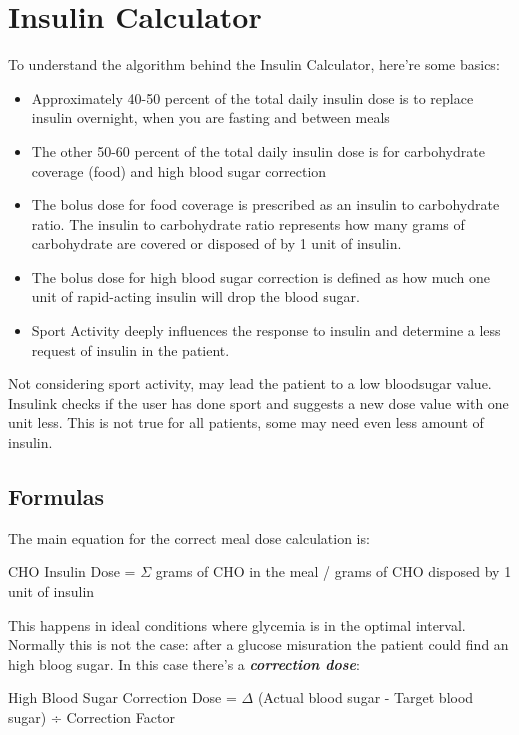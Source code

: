 \documentclass[12pt,hidelinks]{article}
\begin{document}
\section{Insulin Calculator}
\vspace{10.5cm}
To understand the algorithm behind the Insulin Calculator, here're some basics:
\begin{itemize}
 \item  Approximately 40-50 percent of the total daily insulin dose is to replace insulin overnight, when you are fasting and between meals
 \item  The other 50-60 percent of the total daily insulin dose is for carbohydrate coverage (food) and high blood sugar correction
 \item The bolus dose for food coverage is prescribed as an insulin to carbohydrate ratio. The insulin to carbohydrate ratio represents how many grams of carbohydrate are covered or disposed of by 1 unit of insulin.
 \item The bolus dose for high blood sugar correction is defined as how much one unit of rapid-acting insulin will drop the blood sugar.
 \item Sport Activity deeply influences the response to insulin and determine a less request of insulin in the patient.
\end{itemize}
Not considering sport activity, may lead the patient to a low bloodsugar value. 
Insulink checks if the user has done sport and suggests a new dose value with one unit less.
This is not true for all patients, some may need even less amount of insulin.\\
\newpage
\subsection{Formulas}
The main equation for the correct meal dose calculation is:

\begin{center} 
 CHO Insulin Dose = {$\Sigma$} grams of CHO in the meal / grams of CHO disposed by 1 unit of insulin
\end{center}

This happens in ideal conditions where glycemia is in the optimal interval.\\
Normally this is not the case: after a glucose misuration the patient could find an high
bloog sugar. In this case there's a \textbf{\emph{correction dose}}:

\begin{center} 
	High Blood Sugar Correction Dose = {$\Delta$} (Actual blood sugar - Target blood sugar) ÷ Correction Factor
\end{center}
\end{document}
